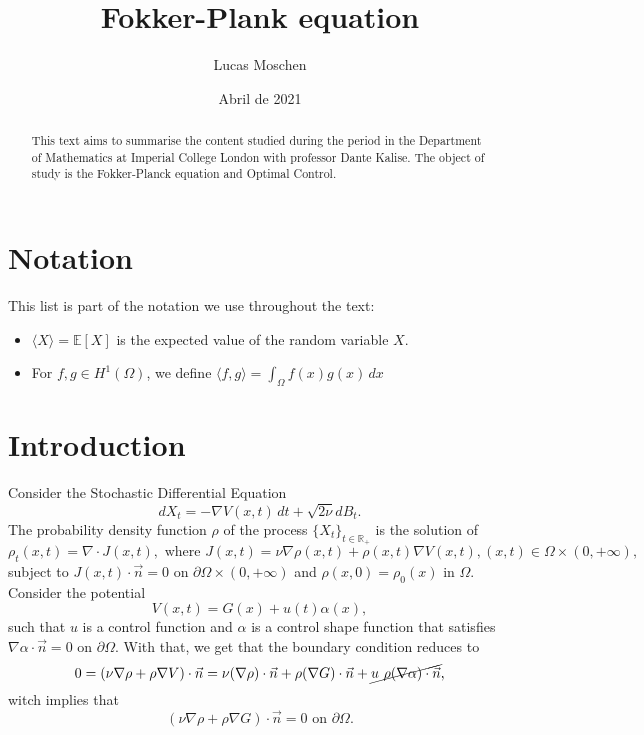 \documentclass[12pt]{article}
\title{Fokker-Plank equation}
\author{Lucas Moschen}
\date{Abril de 2021}
\newcommand{\R}{\mathbb{R}}
\newcommand{\n}{\vec{n}}
\theoremstyle{definition}
\begin{document}
\maketitle

\onehalfspacing{}
    
\begin{abstract}
    This text aims to summarise the content studied during the period in the Department of Mathematics at Imperial College London with professor Dante Kalise.
    The object of study is the Fokker-Planck equation and Optimal Control.
\end{abstract}

\tableofcontents

\section*{Notation}

This list is part of the notation we use throughout the text:

\begin{itemize}
    \item $\langle X \rangle = \mathbb{E}[X]$ is the expected value of the random variable $X$.
    \item For $f, g \in H^1(\Omega)$, we define $\langle f, g \rangle = \int_{\Omega} f(x) g(x) \, dx$
\end{itemize}

\section{Introduction}

Consider the Stochastic Differential Equation
\[
dX_t = -\nabla V(x,t) \, dt + \sqrt{2\nu} dB_t.
\]
The probability density function $\rho$ of the process ${\{X_t\}}_{t \in \R_+}$ is the solution of 
\[
\rho_t(x,t) = \nabla \cdot J(x,t), \text{ where } J(x,t) = \nu \nabla \rho(x,t) + \rho(x,t) \nabla V(x,t), (x,t) \in \Omega \times (0,+\infty), 
\]
subject to $J(x,t) \cdot \n = 0$ on $\partial \Omega \times (0,+\infty)$ and $\rho(x,0) = \rho_0(x)$ in $\Omega$. 
Consider the potential 
\[
V(x,t) = G(x) + u(t) \alpha(x),
\]
such that $u$ is a control function and $\alpha$ is a control shape function that satisfies $\nabla \alpha \cdot \n = 0$ on $\partial \Omega$.
With that, we get that the boundary condition reduces to
\[
0 = (\nu \nabla \rho + \rho \nabla V) \cdot \n = \nu (\nabla \rho) \cdot \n + \rho (\nabla G) \cdot \n + \cancel{u~\rho (\nabla \alpha) \cdot \n},
\]
witch implies that 
\[
(\nu \nabla \rho + \rho \nabla G) \cdot \n = 0 \text{ on } \partial \Omega.
\]
\end{document}
